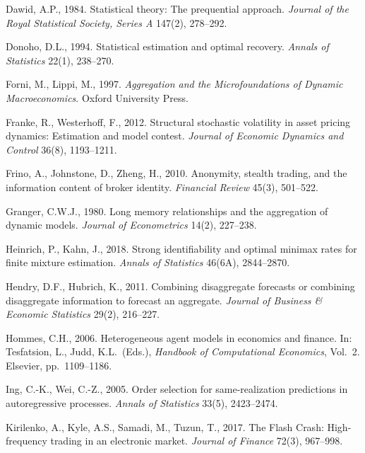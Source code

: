 \documentclass[11pt,letterpaper]{article}
\theoremstyle{definition}
\begin{document}
\begin{list}{}{\small\setlength{\leftmargin}{1.8em}\setlength{\itemindent}{-1.8em}\setlength{\itemsep}{3pt}\setlength{\parsep}{0pt}}
\item Dawid, A.P., 1984. Statistical theory: The prequential approach. \emph{Journal of the Royal Statistical Society, Series A} 147(2), 278--292.

\item Donoho, D.L., 1994. Statistical estimation and optimal recovery. \emph{Annals of Statistics} 22(1), 238--270.

\item Forni, M., Lippi, M., 1997. \emph{Aggregation and the Microfoundations of Dynamic Macroeconomics}. Oxford University Press.

\item Franke, R., Westerhoff, F., 2012. Structural stochastic volatility in asset pricing dynamics: Estimation and model contest. \emph{Journal of Economic Dynamics and Control} 36(8), 1193--1211.

\item Frino, A., Johnstone, D., Zheng, H., 2010. Anonymity, stealth trading, and the information content of broker identity. \emph{Financial Review} 45(3), 501--522.

\item Granger, C.W.J., 1980. Long memory relationships and the aggregation of dynamic models. \emph{Journal of Econometrics} 14(2), 227--238.

\item Heinrich, P., Kahn, J., 2018. Strong identifiability and optimal minimax rates for finite mixture estimation. \emph{Annals of Statistics} 46(6A), 2844--2870.

\item Hendry, D.F., Hubrich, K., 2011. Combining disaggregate forecasts or combining disaggregate information to forecast an aggregate. \emph{Journal of Business \& Economic Statistics} 29(2), 216--227.

\item Hommes, C.H., 2006. Heterogeneous agent models in economics and finance. In: Tesfatsion, L., Judd, K.L.\ (Eds.), \emph{Handbook of Computational Economics}, Vol.~2. Elsevier, pp.\ 1109--1186.

\item Ing, C.-K., Wei, C.-Z., 2005. Order selection for same-realization predictions in autoregressive processes. \emph{Annals of Statistics} 33(5), 2423--2474.

\item Kirilenko, A., Kyle, A.S., Samadi, M., Tuzun, T., 2017. The Flash Crash: High-frequency trading in an electronic market. \emph{Journal of Finance} 72(3), 967--998.


\end{list}
\end{document}
